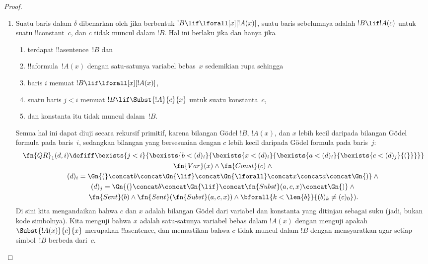 \documentclass[../../../include/open-logic-section]{subfiles}
\begin{document}
\begin{proof}
\begin{enumerate}
  jika terdapat baris $j$ dan $k < i$ dengan !!{sentence} pada baris~$j$
  merupakan suatu formula $!A$, kalimat pada baris~$k$ adalah
  $!A \lif !B$, dan kalimat pada baris~$i$ adalah~$!B$.
  \begin{multline*}
    \fn{MP}(d, i) \defiff \bexists{j < i}{\bexists{k < i}{}}\\
    (d)_k = \Gn{(} \concat (d)_j
      \concat \Gn{\lif} \concat (d)_i \concat \Gn{)}
  \end{multline*}
  Karena kuantifikasi terbatas, perangkaian, dan $=$ bersifat rekursif
  primitif, rumusan ini mendefinisikan relasi rekursif primitif.
\item Suatu baris dalam $\delta$ dibenarkan oleh \QR{} jika berbentuk
  $!B \lif \lforall[x][!A(x)]$, suatu baris sebelumnya adalah
  $!B \lif !A(c)$ untuk suatu !!{constant}~$c$, dan $c$ tidak muncul dalam
  $!B$. Hal ini berlaku jika dan hanya jika
  \begin{enumerate}
  \item terdapat !!a{sentence}~$!B$ dan
  \item !!a{formula}~$!A(x)$ dengan satu-satunya variabel bebas~$x$ sedemikian
    rupa sehingga
  \item baris $i$ memuat $!B \lif \lforall[x][!A(x)]$,
  \item suatu baris $j < i$ memuat $!B \lif \Subst{!A}{c}{x}$ untuk suatu
    konstanta~$c$,
  \item dan konstanta itu tidak muncul dalam~$!B$.
  \end{enumerate}
  Semua hal ini dapat diuji secara rekursif primitif, karena bilangan G\"odel
  $!B$, $!A(x)$, dan $x$ lebih kecil daripada bilangan G\"odel formula pada
  baris~$i$, sedangkan bilangan yang bersesuaian dengan $c$ lebih kecil daripada
  G\"odel formula pada baris~$j$:
  \begin{multline*}
    \fn{QR}_1(d, i) \defiff \bexists{j<i}{\bexists{b < (d)_i}{\bexists{x <
        (d)_i}{\bexists{a < (d)_i}{\bexists{c < (d)_j}{(}}}}}
    \\ \fn{Var}(x) \land \fn{Const}(c) \land {} \\
    (d)_i = \Gn{(} \concat
    b \concat \Gn{\lif} \concat \Gn{\lforall} \concat x \concat a
    \concat \Gn{)} \land {}\\
    (d)_j = \Gn{(} \concat b \concat
    \Gn{\lif} \concat \fn{Subst}(a,c,x) \concat \Gn{)} \land {}\\
    \fn{Sent}(b) \land \fn{Sent}(\fn{Subst}(a,c,x)) \land {}
    \bforall{k < \len{b}}{(b)_k \neq (c)_0}).
  \end{multline*}
  Di sini kita mengandaikan bahwa $c$ dan $x$ adalah bilangan G\"odel dari
  variabel dan konstanta yang ditinjau sebagai suku (jadi, bukan kode
  simbolnya). Kita menguji bahwa $x$ adalah satu-satunya variabel bebas dalam
  $!A(x)$ dengan menguji apakah $\Subst{!A(x)}{c}{x}$ merupakan
  !!a{sentence}, dan memastikan bahwa $c$ tidak muncul dalam $!B$ dengan
  mensyaratkan agar setiap simbol~$!B$ berbeda dari~$c$.


\end{enumerate}
\end{proof}
\end{document}
